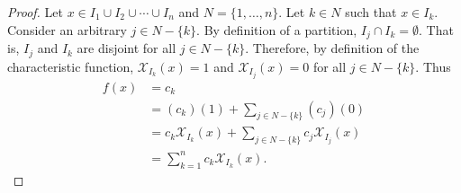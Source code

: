 \documentclass{report}
\begin{document}
\begin{proof}

  Let $x \in I_1 \cup I_2 \cup \cdots \cup I_n$ and $N = \{1, \ldots, n\}$.
  Let $k \in N$ such that $x \in I_k$.
  Consider an arbitrary $j \in N - \{k\}$.
  By definition of a partition, $I_j \cap I_k = \emptyset$.
  That is, $I_j$ and $I_k$ are disjoint for all $j \in N - \{k\}$.
  Therefore, by definition of the characteristic function,
    $\mathcal{X}_{I_k}(x) = 1$ and $\mathcal{X}_{I_j}(x) = 0$ for all
    $j \in N - \{k\}$.
  Thus
    \begin{align*}
      f(x)
        & = c_k \\
        & = (c_k)(1) + \sum\nolimits_{j \in N - \{k\}} (c_j)(0) \\
        & = c_k\mathcal{X}_{I_k}(x) +
          \sum\nolimits_{j \in N - \{k\}} c_j\mathcal{X}_{I_j}(x) \\
        & = \sum_{k=1}^n c_k\mathcal{X}_{I_k}(x).
    \end{align*}

\end{proof}
\end{document}
